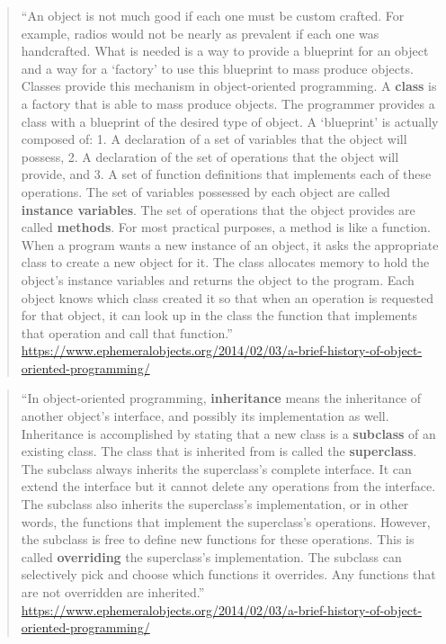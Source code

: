 \documentclass[]{tufte-book}
\begin{document}
\begin{quote}
``An object is not much good if each one must be custom crafted. For example,
radios would not be nearly as prevalent if each one was handcrafted. What is
needed is a way to provide a blueprint for an object and a way for a `factory'
to use this blueprint to mass produce objects. Classes provide this mechanism in
object-oriented programming. A \textbf{class} is a factory that is able to mass
produce objects. The programmer provides a class with a blueprint of the desired
type of object. A `blueprint' is actually composed of: 1. A declaration of a set
of variables that the object will possess, 2. A declaration of the set of
operations that the object will provide, and 3. A set of function definitions
that implements each of these operations. The set of variables possessed by each
object are called \textbf{instance variables}. The set of operations that the object
provides are called \textbf{methods}. For most practical purposes, a method is like a
function. When a program wants a new instance of an object, it asks the
appropriate class to create a new object for it. The class allocates memory to
hold the object's instance variables and returns the object to the program. Each
object knows which class created it so that when an operation is requested for
that object, it can look up in the class the function that implements that
operation and call that function.''
\url{https://www.ephemeralobjects.org/2014/02/03/a-brief-history-of-object-oriented-programming/}
\end{quote}

\begin{quote}
``In object-oriented programming, \textbf{inheritance} means the inheritance of
another object's interface, and possibly its implementation as well. Inheritance
is accomplished by stating that a new class is a \textbf{subclass} of an existing
class. The class that is inherited from is called the \textbf{superclass}. The
subclass always inherits the superclass's complete interface. It can extend the
interface but it cannot delete any operations from the interface. The subclass
also inherits the superclass's implementation, or in other words, the functions
that implement the superclass's operations. However, the subclass is free to
define new functions for these operations. This is called \textbf{overriding} the
superclass's implementation. The subclass can selectively pick and choose which
functions it overrides. Any functions that are not overridden are inherited.''
\url{https://www.ephemeralobjects.org/2014/02/03/a-brief-history-of-object-oriented-programming/}
\end{quote}
\end{document}
